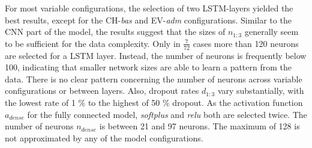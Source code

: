 \documentclass[a4paper,11pt]{article}
\begin{document}
For most variable configurations, the selection of two LSTM-layers yielded the
best results, except for the CH-\emph{bas} and EV-\emph{adm} configurations.
Similar to the CNN part of the model, the results suggest that the sizes of \(n_{1:3}\)
generally seem to be sufficient for the data complexity. Only in \(\frac{7}{72}\) cases
more than 120 neurons are selected for a LSTM layer. Instead, the number of neurons is frequently
below 100, indicating that smaller network sizes are able to learn a pattern from the data.
There is no clear pattern concerning the number of neurons across variable configurations
or between layers. Also, dropout rates \(d_{1:3}\) vary substantially, with the
lowest rate of 1 \% to the highest of 50 \% dropout. As the activation function \(a_{dense}\)
for the fully connected model, \emph{softplus} and \emph{relu} both are selected
twice. The number of neurons \(n_{dense}\) is between 21 and 97 neurons. The maximum
of 128 is not approximated by any of the model configurations.
\end{document}
